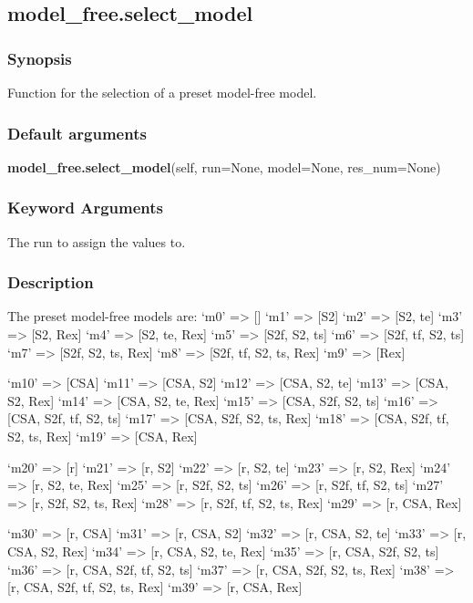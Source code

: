 \newpage

\subsection{model\_free.select\_model}


\subsubsection{Synopsis}

Function for the selection of a preset model-free model.

\subsubsection{Default arguments}

\textsf{\textbf{model\_free.select\_model}(self, run=None, model=None, res\_num=None)}


\subsubsection{Keyword Arguments}

  The run to assign the values to.


\subsubsection{Description}

The preset model-free models are:
    `m0'    => []
    `m1'    => [S2]
    `m2'    => [S2, te]
    `m3'    => [S2, Rex]
    `m4'    => [S2, te, Rex]
    `m5'    => [S2f, S2, ts]
    `m6'    => [S2f, tf, S2, ts]
    `m7'    => [S2f, S2, ts, Rex]
    `m8'    => [S2f, tf, S2, ts, Rex]
    `m9'    => [Rex]

    `m10'   => [CSA]
    `m11'   => [CSA, S2]
    `m12'   => [CSA, S2, te]
    `m13'   => [CSA, S2, Rex]
    `m14'   => [CSA, S2, te, Rex]
    `m15'   => [CSA, S2f, S2, ts]
    `m16'   => [CSA, S2f, tf, S2, ts]
    `m17'   => [CSA, S2f, S2, ts, Rex]
    `m18'   => [CSA, S2f, tf, S2, ts, Rex]
    `m19'   => [CSA, Rex]

    `m20'   => [r]
    `m21'   => [r, S2]
    `m22'   => [r, S2, te]
    `m23'   => [r, S2, Rex]
    `m24'   => [r, S2, te, Rex]
    `m25'   => [r, S2f, S2, ts]
    `m26'   => [r, S2f, tf, S2, ts]
    `m27'   => [r, S2f, S2, ts, Rex]
    `m28'   => [r, S2f, tf, S2, ts, Rex]
    `m29'   => [r, CSA, Rex]

    `m30'   => [r, CSA]
    `m31'   => [r, CSA, S2]
    `m32'   => [r, CSA, S2, te]
    `m33'   => [r, CSA, S2, Rex]
    `m34'   => [r, CSA, S2, te, Rex]
    `m35'   => [r, CSA, S2f, S2, ts]
    `m36'   => [r, CSA, S2f, tf, S2, ts]
    `m37'   => [r, CSA, S2f, S2, ts, Rex]
    `m38'   => [r, CSA, S2f, tf, S2, ts, Rex]
    `m39'   => [r, CSA, Rex]

